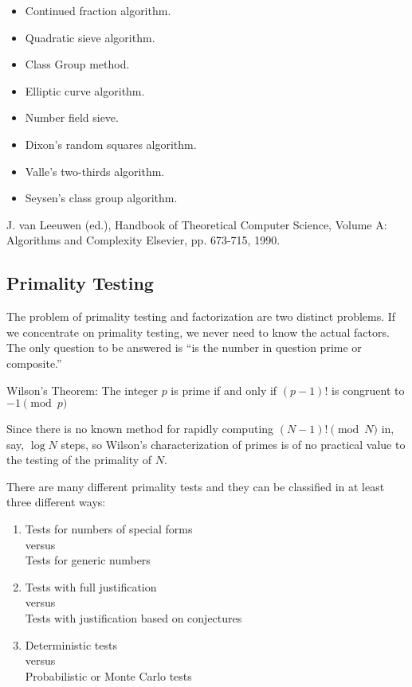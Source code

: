\begin{itemize}
  \item Continued fraction algorithm.
  \item Quadratic sieve algorithm.
  \item Class Group method.
  \item Elliptic curve algorithm.
  \item Number field sieve.
  \item Dixon's random squares algorithm.
  \item Valle's two-thirds algorithm.
  \item Seysen's class group algorithm.
\end{itemize}


\Ref

{J. van Leeuwen (ed.), Handbook of Theoretical Computer Science, Volume
  A: Algorithms and Complexity}{ Elsevier, pp.  673-715, 1990.}

\subsection{Primality Testing}

The problem of primality testing and factorization are two distinct
problems. If we concentrate on primality testing, we never need to know
the actual factors. The only question to be answered is ``is the number
in question prime or composite.''

Wilson's Theorem: The integer $p$ is prime if and only if $(p-1)!$ is
congruent to $-1 \pmod p$

Since there is no known method for rapidly computing $(N-1)! \pmod N$
in, say, $\log N$ steps, so Wilson's characterization of primes is of no
practical value to the testing of the primality of $N$.

There are many different primality tests and they can be classified in
at least three different ways:

\begin{enumerate}
  \item Tests for numbers of special forms \\
  versus \\
  Tests for generic numbers
  \item Tests with full justification \\
  versus\\
  Tests with justification based on conjectures
  \item Deterministic tests\\
  versus \\
  Probabilistic or Monte Carlo tests
\end{enumerate}

